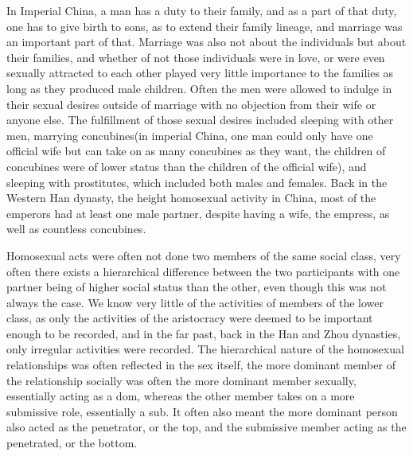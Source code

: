 In Imperial China, a man has a duty to their family, and as a part of that duty, one has to give birth to sons, as to extend their family lineage, and marriage was an important part of that. Marriage was also not about the individuals but about their families, and whether of not those individuals were in love, or were even sexually attracted to each other played very little importance to the families as long as they produced male children. Often the men were allowed to indulge in their sexual desires outside of marriage with no objection from their wife or anyone else\Autocite{10.2307/2961796}. The fulfillment of those sexual desires included sleeping with other men, marrying concubines(in imperial China, one man could only have one official wife but can take on as many concubines as they want, the children of concubines were of lower status than the children of the official wife), and sleeping with prostitutes, which included both males and females. Back in the Western Han dynasty, the height homosexual activity in China, most of the emperors had at least one male partner, despite having a wife, the empress, as well as countless concubines\Autocite{hinsch1990passions}.

Homosexual acts were often not done two members of the same social class, very often there exists a hierarchical difference between the two participants with one partner being of higher social status than the other, even though this was not always the case\Autocite{huang_2013_malemale}. We know very little of the activities of members of the lower class, as only the activities of the aristocracy were deemed to be important enough to be recorded, and in the far past, back in the Han and Zhou dynasties, only irregular activities were recorded. The hierarchical nature of the homosexual relationships was often reflected in the sex itself, the more dominant member of the relationship socially was often the more dominant member sexually, essentially acting as a dom, whereas the other member takes on a more submissive role, essentially a sub. It often also meant the more dominant person also acted as the penetrator, or the top, and the submissive member acting as the penetrated, or the bottom\autocite{huang_2013_malemale}.

